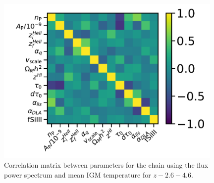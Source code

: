 \begin{figure}
    \centering
    \includegraphics[width=0.98\textwidth]{figures/correlation_z26_46_t0.pdf}
    \caption{\label{fig:correlations}
    Correlation matrix between parameters for the chain using the flux power spectrum and mean IGM temperature for $z-2.6 - 4.6$.
    }
\end{figure}
